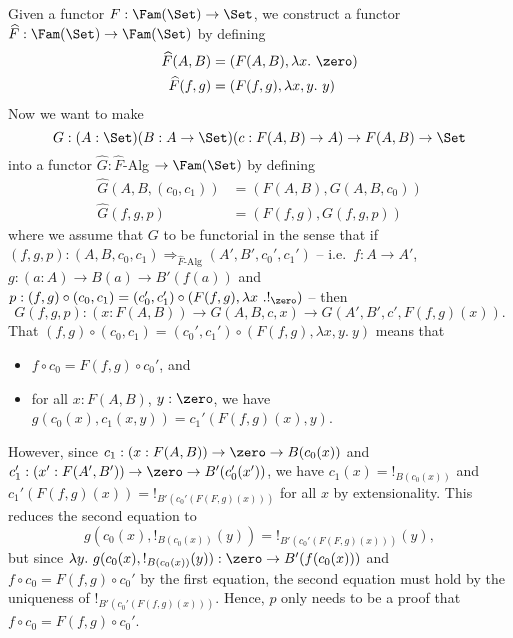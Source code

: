 \documentclass{article}
\begin{document}
Given a functor $F : \Fam(\Set) \to \Set$, we construct a functor
$\widehat{F} : \Fam(\Set) \to \Fam(\Set)$ by defining
\begin{align*}
  \widehat{F}(A, B) &= (F(A, B), \lambda x.\ \zero) \\
  \widehat{F}(f, g) &= (F(f, g), \lambda x, y.\ y)
\end{align*}
Now we want to make
\[
G : (A : \Set)(B : A \to \Set)(c : F(A,B) \to A) \to F(A,B) \to \Set
\]
into a functor $\widehat{G} : \widehat{F}$-Alg $\to \Fam(\Set)$ by defining
\begin{align*}
  \widehat{G}(A, B, (c_0, c_1)) &= (F(A, B), G(A, B, c_0)) \\
  \widehat{G}(f, g, p) &= (F(f, g), G(f, g, p))
\end{align*}
where we assume that $G$ to be functorial in the sense that if $(f, g,
p) : (A, B, c_0, c_1) \Rightarrow_{\widehat{F}\text{-Alg}} (A', B',
c_0', c_1')$ -- i.e.\ $f : A \to A'$, $g : (a : A) \to B(a) \to
B'(f(a))$ and $p : (f,g) \circ (c_0, c_1) = (c_0', c_1') \circ
(F(f,g), \lambda x\ .!_{\zero})$ -- then
\[
G(f,g,p) : (x : F(A, B)) \to G(A, B, c, x) \to G(A', B', c', F(f,g)(x)).
\]
That $(f,g) \circ (c_0, c_1) = (c_0', c_1') \circ
(F(f,g), \lambda x, y.\ y)$ means that 
\begin{itemize}
\item $f \circ c_0 = F(f,g) \circ c_0'$, and
\item for all $x : F(A, B)$, $y : \zero$, we have $g(c_0(x), c_1(x, y)) = c_1'(F(f,g)(x), y)$.
\end{itemize}
However, since $c_1 : (x : F(A, B)) \to \zero \to B(c_0(x))$ and $c_1' : (x' : F(A', B')) \to \zero \to B'(c_0'(x'))$, we have $c_1(x) = !_{B(c_0(x))}$ and $c_1'(F(f,g)(x)) = !_{B'(c_0'(F(F,g)(x)))}$ for all $x$ by extensionality. This reduces the second equation to 
\[
g(c_0(x), !_{B(c_0(x))}(y)) = !_{B'(c_0'(F(F,g)(x)))}(y),
\]
but since $\lambda y.\ g(c_0(x), !_{B(c_0(x))}(y)) : \zero \to
B'(f(c_0(x)))$ and $f \circ c_0 = F(f, g) \circ c_0'$ by the first
equation, the second equation must hold by the uniqueness of
$!_{B'(c_0'(F(f,g)(x)))}$. Hence, $p$ only needs to be a proof that $f
\circ c_0 = F(f,g) \circ c_0'$.
\end{document}
